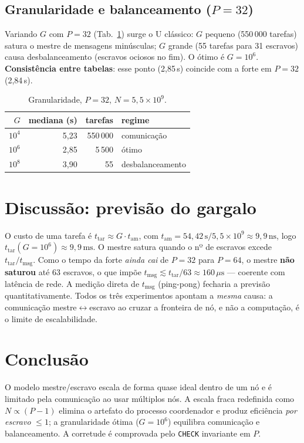 \documentclass[10pt,twocolumn,a4paper]{article}
\begin{document}
\subsection{Granularidade e balanceamento ($P=32$)}
Variando $G$ com $P=32$ (Tab.~\ref{tab:gran}) surge o U clássico: $G$ pequeno
(550\,000 tarefas) satura o mestre de mensagens minúsculas; $G$ grande
(55 tarefas para 31 escravos) causa desbalanceamento (escravos ociosos no
fim). O ótimo é $G=10^6$. \textbf{Consistência entre tabelas}: esse ponto
(2,85\,s) coincide com a forte em $P=32$ (2,84\,s).

\begin{table}[t]\centering\footnotesize
\caption{Granularidade, $P=32$, $N=5{,}5\times10^{9}$.}\label{tab:gran}
\begin{tabular}{rrrl}
\toprule
$G$ & mediana (s) & tarefas & regime \\
\midrule
$10^4$ & 5,23 & 550\,000 & comunicação \\
$10^6$ & 2,85 & 5\,500   & ótimo \\
$10^8$ & 3,90 & 55       & desbalanceamento \\
\bottomrule
\end{tabular}
\end{table}

\section{Discussão: previsão do gargalo}
O custo de uma tarefa é $t_\text{tar}\approx G\cdot t_\text{am}$, com
$t_\text{am}=54{,}42\,\text{s}/5{,}5\times10^{9}\approx 9{,}9\,\text{ns}$, logo
$t_\text{tar}(G{=}10^6)\approx 9{,}9\,\text{ms}$. O mestre satura quando o nº de
escravos excede $t_\text{tar}/t_\text{msg}$. Como o tempo da forte \emph{ainda cai}
de $P=32$ para $P=64$, o mestre \textbf{não saturou} até 63 escravos, o que impõe
$t_\text{msg}\lesssim t_\text{tar}/63\approx 160\,\mu\text{s}$ --- coerente com
latência de rede. A medição direta de $t_\text{msg}$ (ping-pong) fecharia a previsão
quantitativamente. Todos os três experimentos apontam a \emph{mesma} causa: a
comunicação mestre$\leftrightarrow$escravo ao cruzar a fronteira de nó, e não a
computação, é o limite de escalabilidade.

\section{Conclusão}
O modelo mestre/escravo escala de forma quase ideal dentro de um nó e é limitado
pela comunicação ao usar múltiplos nós. A escala fraca redefinida como
$N\propto(P{-}1)$ elimina o artefato do processo coordenador e produz eficiência
\emph{por escravo} $\le 1$; a granularidade ótima ($G=10^6$) equilibra comunicação e balanceamento. A
corretude é comprovada pelo \texttt{CHECK} invariante em $P$.
\end{document}
